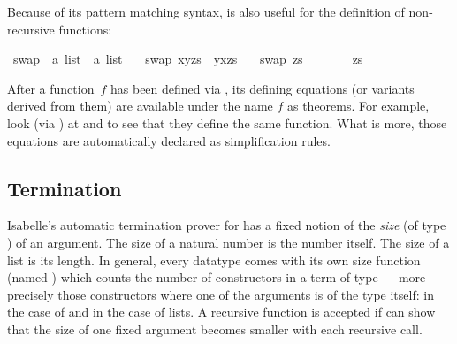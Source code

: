 \begin{isabellebody}
\begin{isamarkuptext}
Because of its pattern matching syntax,  is also useful
for the definition of non-recursive functions:%
\end{isamarkuptext}%
\isamarkuptrue%
\isamarkupfalse%
\ swap{}{}\ {\isacharcolon}{\isacharcolon}\ {\isachardoublequoteopen}{\isacharprime}a\ list\ {\isasymRightarrow}\ {\isacharprime}a\ list{\isachardoublequoteclose}\ \isanewline
\ \ {\isachardoublequoteopen}swap{}{}\ {\isacharparenleft}x{\isacharhash}y{\isacharhash}zs{\isacharparenright}\ {\isacharequal}\ y{\isacharhash}x{\isacharhash}zs{\isachardoublequoteclose}\ {\isacharbar}\isanewline
\ \ {\isachardoublequoteopen}swap{}{}\ zs\ \ \ \ \ \ \ {\isacharequal}\ zs{\isachardoublequoteclose}%
\begin{isamarkuptext}%
After a function~$f$ has been defined via ,
its defining equations (or variants derived from them) are available
under the name $f$ as theorems.
For example, look (via ) at
 and  to see that they define
the same function. What is more, those equations are automatically declared as
simplification rules.

\subsection{Termination}

Isabelle's automatic termination prover for  has a
fixed notion of the \emph{size} (of type ) of an
argument. The size of a natural number is the number itself. The size
of a list is its length. In general, every datatype  comes
with its own size function (named ) which counts the
number of constructors in a term of type  --- more precisely
those constructors where one of the arguments is of the type itself:
 in the case of  and  in the case
of lists. A recursive function is accepted if  can
show that the size of one fixed argument becomes smaller with each
recursive call.


\end{isamarkuptext}
\end{isabellebody}
